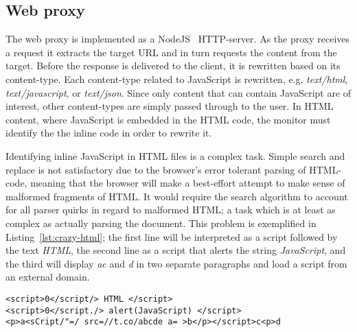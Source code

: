 \documentclass{llncs}
\begin{document}

\subsection{Web proxy}


The web proxy is implemented as a NodeJS~\cite{NodeJS} HTTP-server. As the 
proxy receives a request it extracts the target URL and in turn requests the 
content from the target. Before the response is delivered to the client, it is 
rewritten based on its content-type. Each content-type related to JavaScript is 
rewritten, e.g. \emph{text/html}, \emph{text/javascript}, or \emph{text/json}. 
Since only content that can contain JavaScript are of interest, other 
content-types are simply passed through to the user. In HTML content, where 
JavaScript is embedded in the HTML code, the monitor must identify the 
the inline code in order to rewrite it.

Identifying inline JavaScript in HTML files is a complex task. 
Simple search and replace is not satisfactory due to the browser's error tolerant parsing of HTML-code, meaning that the 
browser will make a best-effort attempt to make sense of malformed fragments of 
HTML. It would require the search 
algorithm to account for all parser quirks in regard to malformed HTML;
a task which is at least as complex as actually parsing the document.
This problem is exemplified in Listing~\ref{lst:crazy-html}; the first line
will be interpreted as a script followed by the text \emph{HTML}, the second
line as a script that alerts the string \emph{JavaScript}, and the third will 
display \emph{ac} and \emph{d} in two separate paragraphs and load a script
from an external domain.

\begin{lstlisting}[label=lst:crazy-html, caption=Example of complicated HTML]
<script>0</script/> HTML </script>
<script>0</script./> alert(JavaScript) </script>
<p>a<sCript/"=/ src=//t.co/abcde a= >b</p></script>c<p>d
\end{lstlisting}
\end{document}
